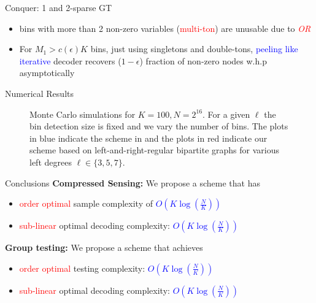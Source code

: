 \documentclass[final]{beamer}
\newlength{\threecolwid}
\newlength{\blockskip}
\newlength{\paraskip}
\begin{document}
\begin{frame}
\begin{columns}[t]
\begin{column}{\threecolwid}
\begin{block}{\Large Conquer: 1 and 2-sparse GT}
\begin{itemize}
\begin{equation*}
\begin{bmatrix}
				    \end{bmatrix}
		        \end{equation*}
		      \item bins with more than 2 non-zero variables (\textcolor{red}{multi-ton}) are unusable due to \textcolor{red}{\textit{OR}}
		      \item For $M_1>c(\epsilon)K$ bins, just using singletons and double-tons, \textcolor{blue}{peeling like iterative} decoder recovers ($1-\epsilon$) fraction of non-zero nodes w.h.p asymptotically
    	\end{itemize}
    \end{block}      

      \begin{block}{\Large Numerical Results}
		   \begin{figure}
     		  \centering
   			\scalebox{1.4}{}   
\caption{Monte Carlo simulations for $K=100, N=2^{16}$. For a given $\ell$ the bin detection size is fixed and we vary the number of bins. The plots in blue indicate the scheme in \cite{lee2015saffron} and the plots in red indicate our scheme based on left-and-right-regular bipartite graphs for various left degrees $\ell\in\{3,5,7\}$.}
			\end{figure}    
      \end{block}  
      

         \begin{alertblock}{\Large Conclusions} 
	    \textbf{Compressed Sensing:} We propose a scheme that has
			\begin{itemize}
			\itemsep10pt
				\item \textcolor{red}{order optimal} sample complexity of \textcolor{blue}{$O(K\log (\frac{N}{K}))$}
				\item \textcolor{red}{sub-linear} optimal decoding complexity: \textcolor{blue}{$O(K\log (\frac{N}{K}))$}
			\end{itemize} 
\vspace{\paraskip}    
  
   \textbf{Group testing:} We propose a scheme that achieves
		\begin{itemize}
		\itemsep10pt
			\item \textcolor{red}{order optimal} testing complexity: \textcolor{blue}{$O(K\log (\frac{N}{K}))$}
			\item \textcolor{red}{sub-linear} optimal decoding complexity: \textcolor{blue}{$O(K\log (\frac{N}{K}))$}
		\end{itemize} 
    \end{alertblock}
\vspace{-\paraskip}    


\end{column}
\end{columns}
\end{frame}
\end{document}
